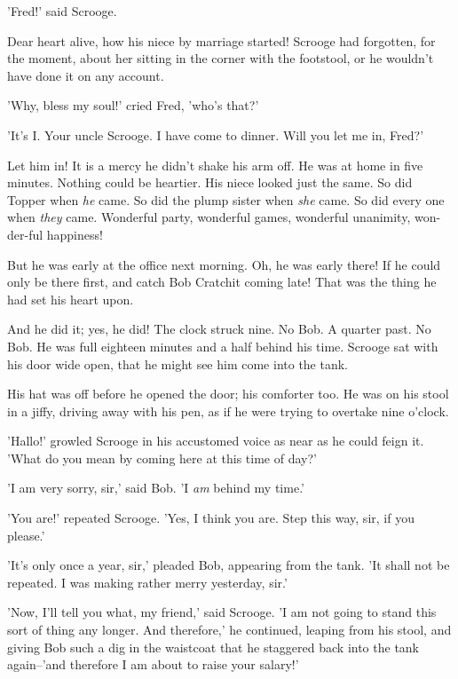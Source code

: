 'Fred!' said Scrooge.

Dear heart alive, how his niece by marriage started! Scrooge had
forgotten, for the moment, about her sitting in the corner with the
footstool, or he wouldn't have done it on any account.

'Why, bless my soul!' cried Fred, 'who's that?'


'It's I. Your uncle Scrooge. I have come to dinner. Will you let me in,
Fred?'

Let him in! It is a mercy he didn't shake his arm off. He was at home in
five minutes. Nothing could be heartier. His niece looked just the same.
So did Topper when \emph{he} came. So did the plump sister when \emph{she} came.
So did every one when \emph{they} came. Wonderful party, wonderful games,
wonderful unanimity, won-der-ful happiness!

But he was early at the office next morning. Oh, he was early there! If
he could only be there first, and catch Bob Cratchit coming late! That
was the thing he had set his heart upon.

And he did it; yes, he did! The clock struck nine. No Bob. A quarter
past. No Bob. He was full eighteen minutes and a half behind his time.
Scrooge sat with his door wide open, that he might see him come into the
tank.

His hat was off before he opened the door; his comforter too. He was on
his stool in a jiffy, driving away with his pen, as if he were trying to
overtake nine o'clock.

'Hallo!' growled Scrooge in his accustomed voice as near as he could
feign it. 'What do you mean by coming here at this time of day?'

'I am very sorry, sir,' said Bob. 'I \emph{am} behind my time.'

'You are!' repeated Scrooge. 'Yes, I think you are. Step this way, sir,
if you please.'

'It's only once a year, sir,' pleaded Bob, appearing from the tank. 'It
shall not be repeated. I was making rather merry yesterday, sir.'

'Now, I'll tell you what, my friend,' said Scrooge. 'I am not going to
stand this sort of thing any longer. And therefore,' he continued,
leaping from his stool, and giving Bob such a dig in the waistcoat that
he staggered back into the tank again--'and therefore I am about to
raise your salary!'

